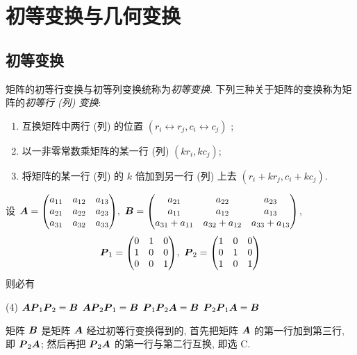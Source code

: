 \section{初等变换与几何变换}

\subsection{初等变换}

\begin{definition}[矩阵的初等变换]
    矩阵的初等行变换与初等列变换统称为\textit{初等变换}. 下列三种关于矩阵的变换称为矩阵的\textit{初等行 (列) 变换}:
    \begin{enumerate}[label=(\arabic{*})]
        \item 互换矩阵中两行 (列) 的位置 $ \left(r_{i} \leftrightarrow r_{j}, c_{i} \leftrightarrow c_{j}\right)$ ;
        \item 以一非零常数乘矩阵的某一行 (列) $ \left(k r_{i}, k c_{j}\right) $;
        \item 将矩阵的某一行 (列) 的 $ k $ 倍加到另一行 (列) 上去 $ \left(r_{i}+k r_{j}, c_{i}+k c_{j}\right) $.
    \end{enumerate}
\end{definition}

\begin{example}
    设 $\vb*{A}=\mqty(\xmat*{a}{3}{3}),~\vb*{B}=\mqty(a_{21}&a_{22}&a_{23}\\a_{11}&a_{12}&a_{13}\\a_{31}+a_{11}&a_{32}+a_{12}&a_{33}+a_{13})$, 
    $$\vb*{P}_1=\mqty(0&1&0\\1&0&0\\0&0&1),~\vb*{P}_2=\mqty(1&0&0\\0&1&0\\1&0&1)$$
    则必有
    \begin{tasks}(4)
        \task $\vb*{AP}_1\vb*{P}_2=\vb*{B}$
        \task $\vb*{AP}_2\vb*{P}_1=\vb*{B}$
        \task $\vb*{P}_1\vb*{P}_2\vb*{A}=\vb*{B}$
        \task $\vb*{P}_2\vb*{P}_1\vb*{A}=\vb*{B}$
    \end{tasks}
\end{example}
\begin{solution}
    矩阵 $\vb*{B}$ 是矩阵 $\vb*{A}$ 经过初等行变换得到的, 首先把矩阵 $\vb*{A}$ 的第一行加到第三行, 即 $\vb*{P}_2\vb*{A}$;
    然后再把 $\vb*{P}_2\vb*{A}$ 的第一行与第二行互换, 即选 C.
\end{solution}

